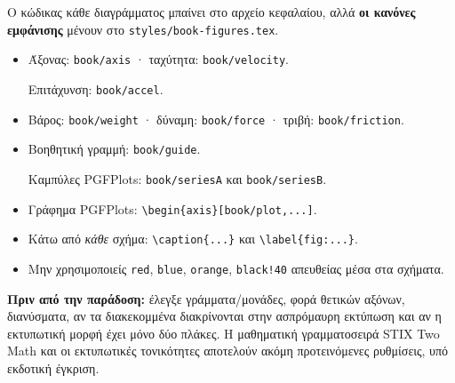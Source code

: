 \noindent Ο κώδικας κάθε διαγράμματος μπαίνει στο αρχείο κεφαλαίου, αλλά \textbf{οι κανόνες εμφάνισης} μένουν στο \texttt{styles/book-figures.tex}.
\begin{itemize}
 \item Άξονας: \texttt{book/axis} · ταχύτητα: \texttt{book/velocity}.\par Επιτάχυνση: \texttt{book/accel}.
 \item Βάρος: \texttt{book/weight} · δύναμη: \texttt{book/force} · τριβή: \texttt{book/friction}.
 \item Βοηθητική γραμμή: \texttt{book/guide}.\par Καμπύλες PGFPlots: \texttt{book/seriesA} και \texttt{book/seriesB}.
 \item Γράφημα PGFPlots: \texttt{\textbackslash begin\{axis\}[book/plot,...]}.
 \item Κάτω από \textit{κάθε} σχήμα: \texttt{\textbackslash caption\{...\}} και \texttt{\textbackslash label\{fig:...\}}.
 \item Μην χρησιμοποιείς \texttt{red}, \texttt{blue}, \texttt{orange}, \texttt{black!40} απευθείας μέσα στα σχήματα.
\end{itemize}
\noindent\textbf{Πριν από την παράδοση:} έλεγξε γράμματα/μονάδες, φορά θετικών αξόνων, διανύσματα, αν τα διακεκομμένα διακρίνονται στην ασπρόμαυρη εκτύπωση και αν η εκτυπωτική μορφή έχει μόνο δύο πλάκες.
\smallskip
{\footnotesize\color{BookHistory}Η μαθηματική γραμματοσειρά STIX Two Math και οι εκτυπωτικές τονικότητες αποτελούν ακόμη προτεινόμενες ρυθμίσεις, υπό εκδοτική έγκριση.}
